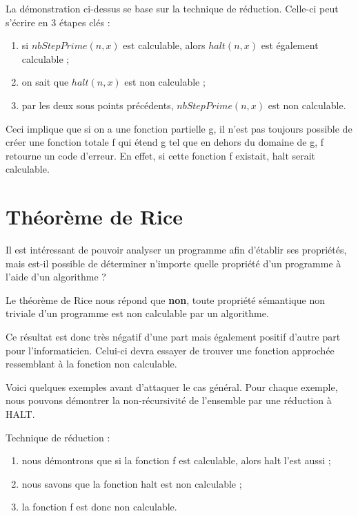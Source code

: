 \begin{myrem}
La démonstration ci-dessus se base sur la technique de réduction. Celle-ci peut s'écrire en 3 étapes clés : 
\begin{enumerate}
    \item si $nbStepPrime(n,x)$ est calculable, alors $halt(n,x)$ est également calculable ;
    \item on sait que $halt(n,x)$ est non calculable ;
    \item par les deux sous points précédents, $nbStepPrime(n,x)$ est non calculable.
\end{enumerate}
\end{myrem}

\begin{myrem}
	Ceci implique que si on a une fonction partielle g, il n'est pas
	toujours possible de créer une fonction totale f qui étend g
	tel que en dehors du domaine de g, f retourne un code d'erreur.  En effet, si cette fonction f existait, halt serait calculable.
\end{myrem}


\section{Théorème de Rice}
\label{sub:theoreme_de_rice}

Il est intéressant de pouvoir analyser un programme afin d'établir ses propriétés, mais est-il possible de déterminer n'importe quelle propriété d'un programme à l'aide d'un algorithme ?

Le théorème de Rice nous répond que \textbf{non}, toute propriété sémantique non triviale d'un programme est non calculable par un algorithme.

Ce résultat est donc très négatif d'une part mais également positif d'autre part pour l'informaticien. Celui-ci devra essayer de trouver une fonction approchée ressemblant à la fonction non calculable.


Voici quelques exemples avant d'attaquer le cas général. Pour chaque exemple, nous pouvons démontrer la non-récursivité de l'ensemble par une réduction à HALT.

Technique de réduction : 
\begin{enumerate}
    \item nous démontrons que si la fonction f est calculable, alors halt l'est aussi ;
    \item nous savons que la fonction halt est non calculable ;
    \item la fonction f est donc non calculable.
\end{enumerate}

